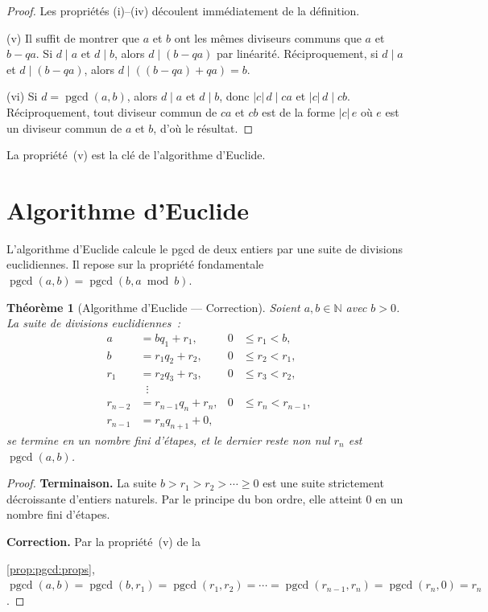 \documentclass[12pt,a4paper,openany]{book}
\theoremstyle{definition}
\theoremstyle{plain}
\newtheorem{theoreme}[definition]{Théorème}
\theoremstyle{remark}
\newcommand{\N}{\mathbb{N}}
\newcommand{\abs}[1]{\left|#1\right|}
\DeclareMathOperator{\pgcd}{pgcd}
\begin{document}
\begin{proof}
Les propriétés (i)--(iv) découlent immédiatement de la définition.

(v) Il suffit de montrer que $a$ et $b$ ont les mêmes diviseurs communs que $a$ et
$b - qa$. Si $d \mid a$ et $d \mid b$, alors $d \mid (b - qa)$ par linéarité.
Réciproquement, si $d \mid a$ et $d \mid (b-qa)$, alors $d \mid ((b-qa) + qa) = b$.

(vi) Si $d = \pgcd(a,b)$, alors $d \mid a$ et $d \mid b$, donc $\abs{c}\,d \mid ca$
et $\abs{c}\,d \mid cb$. Réciproquement, tout diviseur commun de $ca$ et $cb$ est de
la forme $\abs{c}\,e$ où $e$ est un diviseur commun de $a$ et $b$, d'où le résultat.
\end{proof}

La propriété~(v) est la clé de l'algorithme d'Euclide.

\section{Algorithme d'Euclide}
\label{sec:ch1:algo_euclide}


L'algorithme d'Euclide calcule le pgcd de deux entiers par une suite de divisions
euclidiennes. Il repose sur la propriété fondamentale
$\pgcd(a,b) = \pgcd(b, a \bmod b)$.

\begin{theoreme}[Algorithme d'Euclide --- Correction]
\label{thm:algo_euclide}
Soient $a, b \in \N$ avec $b > 0$. La suite de divisions euclidiennes~:
\begin{align*}
  a   &= bq_1 + r_1, & 0 &\leq r_1 < b, \\
  b   &= r_1 q_2 + r_2, & 0 &\leq r_2 < r_1, \\
  r_1 &= r_2 q_3 + r_3, & 0 &\leq r_3 < r_2, \\
      &\;\;\vdots \\
  r_{n-2} &= r_{n-1} q_n + r_n, & 0 &\leq r_n < r_{n-1}, \\
  r_{n-1} &= r_n q_{n+1} + 0,
\end{align*}
se termine en un nombre fini d'étapes, et le dernier reste non nul $r_n$ est
$\pgcd(a,b)$.
\end{theoreme}

\begin{proof}
\textbf{Terminaison.} La suite $b > r_1 > r_2 > \cdots \geq 0$ est une suite
strictement décroissante d'entiers naturels. Par le principe du bon
ordre, elle atteint $0$ en un nombre fini d'étapes.

\textbf{Correction.} Par la propriété~(v) de la 





\ref{prop:pgcd:props},
$\pgcd(a,b) = \pgcd(b, r_1) = \pgcd(r_1, r_2) = \cdots = \pgcd(r_{n-1}, r_n)
= \pgcd(r_n, 0) = r_n$.
\end{proof}
\end{document}
